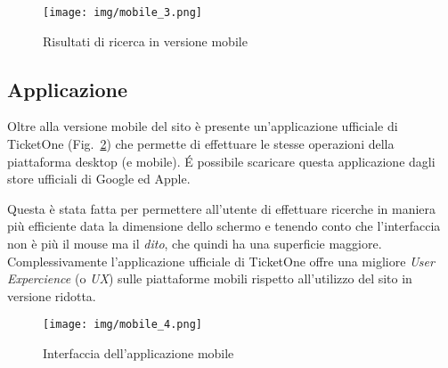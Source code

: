 	\begin{figure}[H]
		\centering
		\texttt{[image: img/mobile\_3.png]}
		\caption{Risultati di ricerca in versione mobile}
		\label{mobile3}
	\end{figure}

\subsection{Applicazione}

	Oltre alla versione mobile del sito è presente un'applicazione ufficiale di TicketOne (Fig.~\ref{mobile4}) che permette di effettuare le stesse operazioni della piattaforma desktop (e mobile).
	\'E possibile scaricare questa applicazione dagli store ufficiali di Google ed Apple.
	\par Questa è stata fatta per permettere all'utente di effettuare ricerche in maniera più efficiente data la dimensione dello schermo e tenendo conto che l'interfaccia non è più il mouse ma il \textit{dito}, che quindi ha una superficie maggiore.
	Complessivamente l'applicazione ufficiale di TicketOne offre una migliore \textit{User Expercience} (o \textit{UX}) sulle piattaforme mobili rispetto all'utilizzo del sito in versione ridotta.
	
	\begin{figure}[H]
		\centering
		\texttt{[image: img/mobile\_4.png]}
		\caption{Interfaccia dell'applicazione mobile}
		\label{mobile4}
	\end{figure}